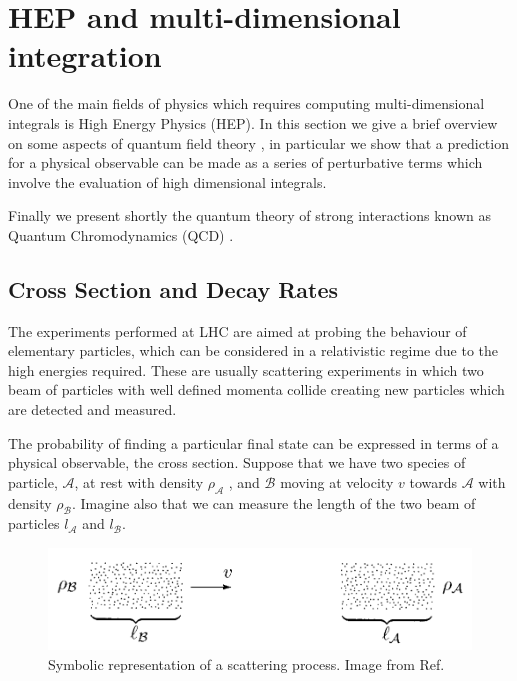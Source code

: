 \documentclass[../main/main.tex]{subfiles}
\begin{document}
\section{HEP and multi-dimensional integration}
One of the main fields of physics which requires computing multi-dimensional integrals is High Energy Physics (HEP).
In this section we give a brief overview on some aspects of quantum field theory \cite{Peskin:1995ev, Schwartz:2017hep}, in particular we show that a prediction for a physical
observable can be made as a series of perturbative terms which involve the evaluation of high dimensional integrals.

Finally we present shortly the quantum theory of strong interactions known as Quantum Chromodynamics (QCD) \cite{Collins:2011zzd, Muta:2010xua, Ellis:1991qj, Skands:2012ts}.


\subsection{Cross Section and Decay Rates}
The experiments performed at LHC are aimed at probing the behaviour of elementary particles, which can be considered in a 
relativistic regime due to the high energies required. These are usually scattering experiments in which two beam of particles with well defined momenta collide creating new particles which are detected and measured.

The probability of finding a particular final state can be expressed in terms of a physical observable, the cross section.
Suppose that we have two species of particle, $\mathcal{A}$, at rest with density $\rho_\mathcal{A}$ , and $\mathcal{B}$ moving at velocity $v$ towards $\mathcal{A}$ with density $\rho_\mathcal{B}$. Imagine also that we can measure the length of the two beam of particles $l_\mathcal{A}$ and $l_\mathcal{B}$. 

\begin{figure}[h]
	\centering
	\includegraphics[width=12cm]{../images/peskin.png}
	\caption{Symbolic representation of a scattering process. Image from Ref\cite{Peskin:1995ev}.}
	\label{Potential}
\end{figure}
\end{document}
